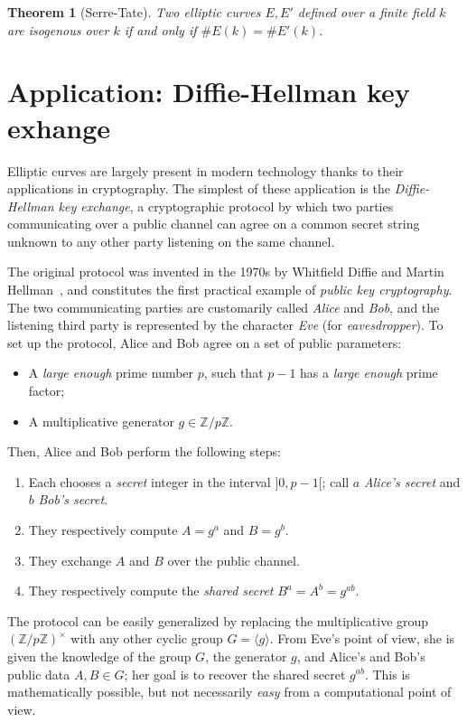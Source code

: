 \documentclass[10pt]{article}
\theoremstyle{plain}
\newtheorem{theorem}{Theorem}
\theoremstyle{definition}
\begin{document}
\begin{theorem}[Serre-Tate]
  \label{th:sato-tate}
  Two elliptic curves $E,E'$ defined over a finite field $k$ are
  isogenous over $k$ if and only if $\#E(k)=\#E'(k)$.
\end{theorem}


\section{Application: Diffie-Hellman key exhange}
\label{sec:appl-diff-hellm}

Elliptic curves are largely present in modern technology thanks to
their applications in cryptography. %
The simplest of these application is the \emph{Diffie-Hellman key
  exchange}, a cryptographic protocol by which two parties
communicating over a public channel can agree on a common secret
string unknown to any other party listening on the same channel.

The original protocol was invented in the 1970s by Whitfield Diffie
and Martin Hellman~\cite{dh}, and constitutes the first practical
example of \emph{public key cryptography}. %
The two communicating parties are customarily called \emph{Alice} and
\emph{Bob}, and the listening third party is represented by the
character \emph{Eve} (for \emph{eavesdropper}). %
To set up the protocol, Alice and Bob agree on a set of public
parameters:
\begin{itemize}
\item A \emph{large enough} prime number $p$, such that $p-1$ has a
  \emph{large enough} prime factor;
\item A multiplicative generator $g∈ℤ/pℤ$.
\end{itemize}

Then, Alice and Bob perform the following steps:
\begin{enumerate}
\item Each chooses a \emph{secret} integer in the interval $]0,p-1[$;
  call $a$ \emph{Alice's secret} and $b$ \emph{Bob's secret}.
\item They respectively compute $A=g^a$ and $B=g^b$.
\item They exchange $A$ and $B$ over the public channel.
\item They respectively compute the \emph{shared secret}
  $B^a=A^b=g^{ab}$.
\end{enumerate}

The protocol can be easily generalized by replacing the multiplicative
group $(ℤ/pℤ)^{×}$ with any other cyclic group $G=〈g〉$. %
From Eve's point of view, she is given the knowledge of the group $G$,
the generator $g$, and Alice's and Bob's public data $A,B∈G$; her goal
is to recover the shared secret $g^{ab}$. %
This is mathematically possible, but not necessarily \emph{easy} from
a computational point of view.
\end{document}
